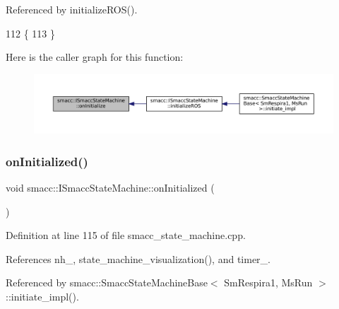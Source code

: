Referenced by initialize\+R\+O\+S().


\begin{DoxyCode}
112 \{
113 \}
\end{DoxyCode}
Here is the caller graph for this function\+:
\nopagebreak
\begin{figure}[H]
\begin{center}
\leavevmode
\includegraphics[width=350pt]{classsmacc_1_1ISmaccStateMachine_ac2982c6c8283663e5e1e8a7c82f511ec_icgraph}
\end{center}
\end{figure}
\mbox{\label{classsmacc_1_1ISmaccStateMachine_a95e7f71d0d88fffd0afebb1f9ccdade5}} 
\subsubsection{\texorpdfstring{on\+Initialized()}{onInitialized()}}
{\footnotesize\ttfamily void smacc\+::\+I\+Smacc\+State\+Machine\+::on\+Initialized (\begin{DoxyParamCaption}{ }\end{DoxyParamCaption})\hspace{0.3cm}{\ttfamily [protected]}}



Definition at line 115 of file smacc\+\_\+state\+\_\+machine.\+cpp.



References nh\+\_\+, state\+\_\+machine\+\_\+visualization(), and timer\+\_\+.



Referenced by smacc\+::\+Smacc\+State\+Machine\+Base$<$ Sm\+Respira1, Ms\+Run $>$\+::initiate\+\_\+impl().


